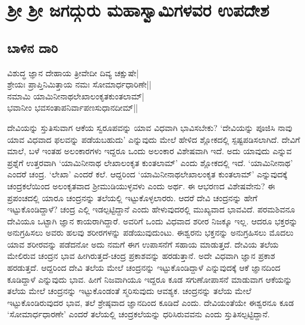 \chapter*{ಶ್ರೀ ಶ್ರೀ ಜಗದ್ಗುರು ಮಹಾಸ್ವಾಮಿಗಳವರ ಉಪದೇಶ}

\section{ಬಾಳಿನ ದಾರಿ}


\begin{shloka}
ವಿಶುದ್ಧ ಜ್ಞಾನ ದೇಹಾಯ ತ್ರೀವೇದೀ ದಿವ್ಯ ಚಕ್ಷುಷೇ|\\
ಶ್ರೇಯಃ ಪ್ರಾಪ್ತಿನಿಮಿತ್ತಾಯ ನಮಃ ಸೋಮಾರ್ಧಧಾರಿಣೇ||\\
ನಮಾಮಿ ಯಾಮಿನೀನಾಥಲೇಖಾಲಂಕೃತಕುಂತಲಾಮ್|\\
ಭವಾನೀಂ ಭವಸಂತಾಪನಿರ್ವಾಪಣಸುಧಾನದೀಮ್||
\end{shloka}


ದೇವಿಯನ್ನು ಸ್ತುತಿಸುವಾಗ ಆಕೆಯ ಸ್ವರೂಪವನ್ನು ಯಾವ ವಿಧವಾಗಿ ಭಾವಿಸಬೇಕು? `ದೇವಿಯನ್ನು ಪೂಜಿಸಿ ನಾವು ಯಾವ 
ವಿಧವಾದ ಫಲವನ್ನು ಪಡೆಯಬಹುದು' ಎನ್ನುವುದು ಮೇಲೆ ಹೇಳಿದ ಶ್ಲೋಕದಲ್ಲಿ ಸ್ಪಷ್ಟಪಡಿಸಲಾಗಿದೆ. ದೇವಿಗೆ 
ಮಾಲೆ, ಬಳೆ ಇಂತಹ ಅಲಂಕಾರಗಳು ಇದ್ದರೂ ಒಂದು ಅಲಂಕಾರ ವಿಶೇಷವಾಗಿ ಇದೆ. ಅದು ಯಾವುದು ಎನ್ನುವ ಪ್ರಶ್ನೆಗೆ 
ಉತ್ತರವಾಗಿ `ಯಾಮಿನೀನಾಥ ಲೇಖಾಲಂಕೃತ ಕುಂತಲಾಮ್' ಎಂದು ಶ್ಲೋಕದಲ್ಲಿ ಇದೆ. `ಯಾಮಿನೀನಾಥ' 
ಎಂದರೆ ಚಂದ್ರ. `ಲೇಖಾ' ಎಂದರೆ ಕಲೆ. ಆದ್ದರಿಂದ `ಯಾಮಿನೀನಾಥಲೇಖಾಲಂಕೃತ ಕುಂತಲಾಮ್' ಎನ್ನುವುದಕ್ಕೆ 
ಚಂದ್ರಕಲೆಯಿಂದ ಅಲಂಕೃತವಾದ ಶ್ರೀಮುಡಿಯುಳ್ಳವಳು ಎಂದು ಅರ್ಥ. ಈ ಆಭರಣದ ವಿಶೇಷವೇನು? ಈ 
ಪ್ರಪಂಚದಲ್ಲಿ ಯಾರೂ ಚಂದ್ರನನ್ನು ತಲೆಯಲ್ಲಿ ಇಟ್ಟುಕೊಳ್ಳಲಾರರು. ಆದರೆ ದೇವಿ ಚಂದ್ರನನ್ನು ಹೇಗೆ ಇಟ್ಟುಕೊಂಡಿದ್ದಾಳೆ? ಚಂದ್ರ 
ಎಲ್ಲಿ ಇಡಲ್ಪಟ್ಟಿದ್ದಾನೆ ಎಂದು ಹೇಳುವುದರಲ್ಲಿ ಮುಖ್ಯವಾದ ಭಾವವಿದೆ. ಪರಮಶಿವನೂ ದೇವಿಯೂ ಒಟ್ಟಾಗಿ 
ಜ್ಞಾನ ಕಾಯರಾಗಿದ್ದಾರೆ. ಅವರಿಗೆ ಒಂದು ವಿಧವಾದ ಶರೀರ ನಿಜಕ್ಕೂ ಇಲ್ಲ. ಆದರೂ ಭಕ್ತರನ್ನು ಅನುಗ್ರಹಿಸಲು 
ಅವರು ಹಲವು ಶರೀರಗಳನ್ನು ಪಡೆಯುವುದುಂಟು. ಈಶ್ವರನು ಭಕ್ತನನ್ನು ಅನುಗ್ರಹಿಸಲು ಮೊದಲು ಯಾವ ಶರೀರವನ್ನು 
ಪಡೆದನೋ ಅದು ನಮಗೆ ಈಗ ಉಪಾಸನೆಗೆ ಸಹಾಯ ಮಾಡುತ್ತದೆ. ದೇವಿಯ ತಲೆಯ ಮೇಲಿರುವ ಚಂದ್ರನ 
ಭಾವ ಹೀಗಿರುತ್ತದೆ-ಚಂದ್ರ ಪ್ರಕಾಶವನ್ನು ಹರಡುತ್ತಾನೆ. ಅದೇ ವಿಧವಾಗಿ ಜ್ಞಾನ ಪ್ರಕಾಶ ಹರಡುತ್ತದೆ. ಆದ್ದರಿಂದ ದೇವಿ 
ತಲೆಯ ಮೇಲೆ ಚಂದ್ರನನ್ನು ಇಟ್ಟುಕೊಂಡಿದ್ದಾಳೆ ಎನ್ನುವುದಕ್ಕೆ ಆಕೆ ಜ್ಞಾನದಿಂದ ಕೂಡಿದ್ದಾಳೆ ಎನ್ನುವುದು ಭಾವ. ಹೀಗೆ 
ನಿಜವಾಗಿಯೂ ಇದ್ದರೂ ಕೂಡ ಸಗುಣೋಪಾಸನೆ ಮಾಡುವಾಗ ಆಕೆಯನ್ನು ತಲೆಯ ಮೇಲೆ ಚಂದ್ರನನ್ನು ಇಟ್ಟುಕೊಂಡಂತೆ 
ಸ್ಮರಿಸುವುದು ಆವಶ್ಯಕ. ಚಂದ್ರನನ್ನು ತಲೆಯ ಮೇಲೆ ಇಟ್ಟುಕೊಂಡಿರುವುದರ ಭಾವ, ತಲೆ ಶ್ರೇಷ್ಠವಾದ ಜ್ಞಾನದಿಂದ 
ಕೂಡಿದೆ ಎಂದು. ದೇವಿಯಂತೆಯೇ ಈಶ್ವರನೂ ಕೂಡ `ಸೋಮಾರ್ಧಧಾರಣೇ' ಎಂದರೆ ತಲೆಯಲ್ಲಿ ಚಂದ್ರಕಲೆಯನ್ನು ಧರಿಸಿರುವವನು ಎಂದು ಸ್ತುತಿಸಲ್ಪಟ್ಟಿದ್ದಾನೆ.

